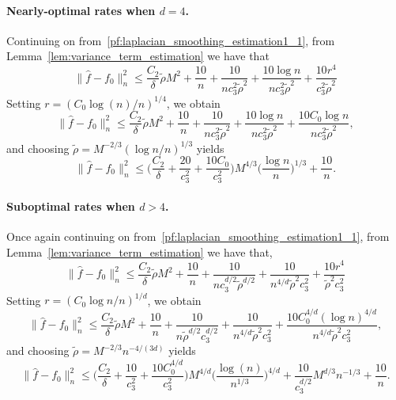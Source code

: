 \documentclass[twoside]{article}
\newcommand{\1}{\mathbf{1}}
\newcommand{\wt}[1]{\widetilde{#1}}
\newcommand{\wh}[1]{\widehat{#1}}
\theoremstyle{definition}
\theoremstyle{remark}
\begin{document}
\paragraph{Nearly-optimal rates when $d = 4$.}
Continuing on from~\eqref{pf:laplacian_smoothing_estimation1_1}, from Lemma~\ref{lem:variance_term_estimation} we have that
\begin{equation*}
\|\wh{f} - f_0\|_n^2 \leq \frac{C_2}{\delta} \wt{\rho} M^2 + \frac{10}{n} +  \frac{10}{nc_3^2\wt{\rho}^2} +  \frac{10 \log n}{nc_3^2\wt{\rho}^2} + \frac{10r^4}{c_3^2\wt{\rho}^2}
\end{equation*}
Setting $r = (C_0\log(n)/n)^{1/4}$, we obtain
\begin{equation*}
\|\wh{f} - f_0\|_n^2 \leq \frac{C_2}{\delta} \wt{\rho} M^2 + \frac{10}{n} +  \frac{10}{nc_3^2\wt{\rho}^2} +  \frac{10 \log n}{nc_3^2\wt{\rho}^2} + \frac{10C_0\log n}{nc_3^2\wt{\rho}^2},
\end{equation*}
and choosing $\wt{\rho} = M^{-2/3}(\log n/n)^{1/3}$ yields
\begin{equation*}
\|\wh{f} - f_0\|_n^2 \leq \biggl(\frac{C_2}{\delta} + \frac{20}{c_3^2} + \frac{10C_0}{c_3^2}\biggr) M^{4/3} \biggl(\frac{\log n}{n}\biggr)^{1/3} + \frac{10}{n}.
\end{equation*}

\paragraph{Suboptimal rates when $d > 4$.}
Once again continuing on from~\eqref{pf:laplacian_smoothing_estimation1_1}, from Lemma~\ref{lem:variance_term_estimation} we have that,
\begin{equation*}
\|\wh{f} - f_0\|_n^2 \leq \frac{C_2}{\delta} \wt{\rho} M^2 + \frac{10}{n} + \frac{10}{nc_3^{d/2}\wt{\rho}^{d/2}} +  \frac{10}{n^{4/d}\wt{\rho}^2c_3^2} + \frac{10r^4}{\wt{\rho}^2c_3^2}
\end{equation*}
Setting $r = (C_0\log n/n)^{1/d}$, we obtain
\begin{equation*}
\|\wh{f} - f_0\|_n^2 \leq \frac{C_2}{\delta} \wt{\rho} M^2 + \frac{10}{n} + \frac{10}{n\wt{\rho}^{d/2}c_3^{d/2}} +  \frac{10}{n^{4/d}\wt{\rho}^2c_3^2} + \frac{10C_0^{4/d}(\log n)^{4/d}}{n^{4/d}\wt{\rho}^2c_3^2},
\end{equation*}
and choosing $\wt{\rho} = M^{-2/3}n^{-4/(3d)}$ yields
\begin{equation*}
\|\wh{f} - f_0\|_n^2 \leq \biggl(\frac{C_2}{\delta} + \frac{10}{c_3^2} + \frac{10C_0^{4/d}}{c_3^2}\biggr)M^{4/d}\biggl(\frac{\log(n)}{n^{1/3}}\biggr)^{4/d} + \frac{10}{c_3^{d/2}}M^{d/3}n^{-1/3} + \frac{10}{n}.
\end{equation*}
\end{document}
